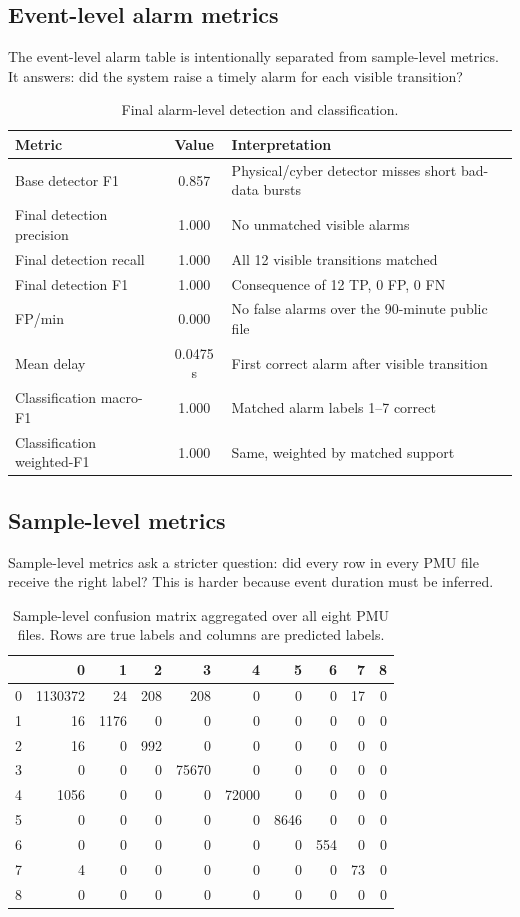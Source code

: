\documentclass[11pt]{article}
\begin{document}
\subsection{Event-level alarm metrics}

The event-level alarm table is intentionally separated from sample-level metrics.
It answers: did the system raise a timely alarm for each visible transition?

\begin{table}[H]
\centering
\caption{Final alarm-level detection and classification.}
\begin{tabular}{lcl}
\toprule
Metric & Value & Interpretation \\
\midrule
Base detector F1 & 0.857 & Physical/cyber detector misses short bad-data bursts \\
Final detection precision & 1.000 & No unmatched visible alarms \\
Final detection recall & 1.000 & All 12 visible transitions matched \\
Final detection F1 & 1.000 & Consequence of 12 TP, 0 FP, 0 FN \\
FP/min & 0.000 & No false alarms over the 90-minute public file \\
Mean delay & 0.0475 s & First correct alarm after visible transition \\
Classification macro-F1 & 1.000 & Matched alarm labels 1--7 correct \\
Classification weighted-F1 & 1.000 & Same, weighted by matched support \\
\bottomrule
\end{tabular}
\label{tab:alarm_metrics}
\end{table}

\subsection{Sample-level metrics}

Sample-level metrics ask a stricter question: did every row in every PMU file
receive the right label? This is harder because event duration must be inferred.

\begin{table}[H]
\centering
\caption{Sample-level confusion matrix aggregated over all eight PMU files. Rows are true labels and columns are predicted labels.}
\scriptsize
\begin{tabular}{c|rrrrrrrrr}
 &0&1&2&3&4&5&6&7&8\\
\hline
0&1130372&24&208&208&0&0&0&17&0\\
1&16&1176&0&0&0&0&0&0&0\\
2&16&0&992&0&0&0&0&0&0\\
3&0&0&0&75670&0&0&0&0&0\\
4&1056&0&0&0&72000&0&0&0&0\\
5&0&0&0&0&0&8646&0&0&0\\
6&0&0&0&0&0&0&554&0&0\\
7&4&0&0&0&0&0&0&73&0\\
8&0&0&0&0&0&0&0&0&0\\
\end{tabular}
\label{tab:confusion}
\end{table}
\end{document}
